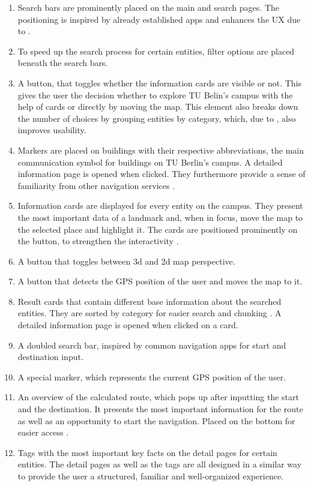\begin{enumerate}
    \item Search bars are prominently placed on the main and search pages. The positioning is inspired by already established apps and enhances the UX due to \cite{jakobs_law}.
    \item To speed up the search process for certain entities, filter options are placed beneath the search bars.
    \item A button, that toggles whether the information cards are visible or not. This gives the user the decision whether to explore TU Belin's campus with the help of cards or directly by moving the map. This element also breaks down the number of choices by grouping entities by category, which, due to \cite{hicks_law}, also improves usability.
    \item Markers are placed on buildings with their respective abbreviations, the main communication symbol for buildings on TU Berlin's campus. A detailed information page is opened when clicked. They furthermore provide a sense of familiarity from other navigation services \cite{jakobs_law}.
    \item Information cards are displayed for every entity on the campus. They present the most important data of a landmark and, when in focus, move the map to the selected place and highlight it. The cards are positioned prominently on the button, to strengthen the interactivity \cite{fitts_law}.
    \item A button that toggles between 3d and 2d map perspective.
    \item A button that detects the GPS position of the user and moves the map to it.
    \item Result cards that contain different base information about the searched entities. They are sorted by category for easier search and chunking \cite{hicks_law}. A detailed information page is opened when clicked on a card.
    \item A doubled search bar, inspired by common navigation apps \cite{jakobs_law} for start and destination input.
    \item A special marker, which represents the current GPS position of the user.
    \item An overview of the calculated route, which pops up after inputting the start and the destination. It presents the most important information for the route as well as an opportunity to start the navigation. Placed on the bottom for easier access \cite{fitts_law}.
    \item Tags with the most important key facts on the detail pages for certain entities. The detail pages as well as the tags are all designed in a similar way to provide the user a structured, familiar and well-organized experience.

\end{enumerate}
